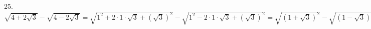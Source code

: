 25. $\sqrt{4+2\sqrt{3}}-\sqrt{4-2\sqrt{3}}=\sqrt{1^2+2\cdot1\cdot\sqrt{3}+(\sqrt{3})^2}-\sqrt{1^2-2\cdot1\cdot\sqrt{3}+(\sqrt{3})^2}=
\sqrt{(1+\sqrt{3})^2}-\sqrt{(1-\sqrt{3})^2}=1+\sqrt{3}-\sqrt{3}+1=2.$\\
